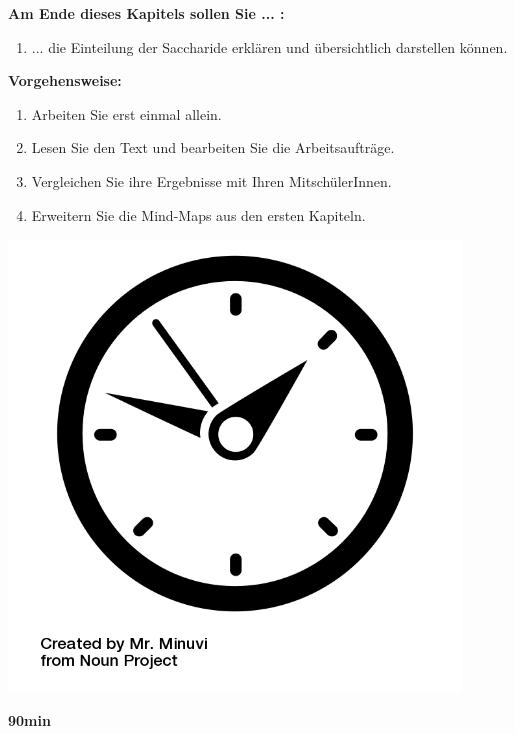 \documentclass{scrartcl}  %
\begin{document}
		\begin{minipage}{0.7\textwidth}
			\noindent \textbf{Am Ende dieses Kapitels sollen Sie ... :}
			\begin{enumerate}
				\item ... die Einteilung der Saccharide erklären und übersichtlich darstellen können.

			\end{enumerate}
			\textbf{Vorgehensweise:}
			\begin{enumerate}
				\item Arbeiten Sie erst einmal allein.
				\item  Lesen Sie den Text und bearbeiten Sie die Arbeitsaufträge.
				\item  Vergleichen Sie ihre Ergebnisse mit Ihren MitschülerInnen.
				\item  Erweitern Sie die Mind-Maps aus den ersten Kapiteln.
			\end{enumerate}
			
		\end{minipage}
		\hspace{0.1\textwidth}
		\begin{minipage}{0.2\textwidth}
			\begin{tcolorbox}
				[enhanced,
				width=0.9\textwidth,
				colback=white,
				colframe=black,
				fonttitle=\sffamily\bfseries\large, 
				title=Zeit,  %
				attach boxed title to top center={xshift=-0.0mm,yshift=-0.50mm},
				boxed title style={skin=enhancedfirst jigsaw,size=small,arc=1mm,bottom=-1mm,colframe=black,height=0.75cm},
				colbacktitle=black,
				drop lifted shadow]
				\centering
				\includegraphics[width=0.9\textwidth]{symbols/symbol_tex_time}
				
				\begin{center}
					\textbf{90min}
				\end{center}
			\end{tcolorbox}
		\end{minipage}
		
\end{document}
